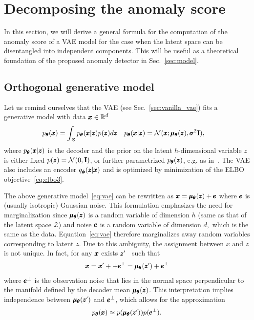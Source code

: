 \section{Decomposing the anomaly score} 
\label{sec:theory}
In this section, we will derive a general formula for the computation of the anomaly score of a VAE model for the case when the latent space can be disentangled into independent components. This will be useful as a theoretical foundation of the proposed anomaly detector in Sec.~\ref{sec:model}.

\subsection{Orthogonal generative model} \label{sec:orthogonal_score}
Let us remind ourselves that the VAE (see Sec.~\ref{sec:vanilla_vae}) fits a generative model with data $\pmb{{x}} \in \mathbb{R}^d$
\begin{align}
p_{\pmb{{\theta}}}(\pmb{{x}}) & = \int_{\mathcal{Z}} p_{\pmb{{\theta}}}(\pmb{{x}} \vert \pmb{{z}})p(\pmb{{z}})d\pmb{{z}} & p_{\pmb{{\theta}}}(\pmb{{x}} \vert \pmb{{z}}) & =\mathcal{N}(\pmb{{x}};\pmb{{\mu}}_{\pmb{{\theta}}}(\pmb{{z}}),\pmb{{\sigma}}^{2} \mathbf{I}),\label{eq:vae}
\end{align}
where $p_{\pmb{{\theta}}}(\pmb{{x}}\vert \pmb{{z}})$ is the decoder and the prior on the latent $h$-dimensional variable $z$ is either fixed $p(\pmb{{z}})=\mathcal{N}(0,\mathbf{I})$, or further parametrized $p_{\pmb{{\theta}}}(\pmb{{z}})$, e.g. as in~\cite{tomczak2017vae}. The VAE also includes an encoder $q_{\pmb{{\phi}}}(\pmb{{z}}\vert \pmb{{x}})$ and is optimized by minimization of the ELBO objective~\eqref{eq:elbo3}. 

The above generative model~\eqref{eq:vae} can be rewritten as $\pmb{{x}}=\pmb{{\mu}}_{\pmb{{\theta}}}(\pmb{{z}})+\pmb{{e}}$ where $\pmb{{e}}$ is (usually isotropic) Gaussian noise. This formulation emphasizes the need for marginalization since $\pmb{{\mu}}_{\pmb{{\theta}}}(\pmb{{z}})$ is a random variable of dimension $h$ (same as that of the latent space $\mathcal{Z}$) and noise $\pmb{{e}}$ is a random variable of dimension $d,$ which is the same as the data. Equation~\eqref{eq:vae} therefore marginalizes away random variables corresponding to latent $z.$ Due to this ambiguity, the assignment between $x$ and $z$ is not unique. In fact, for any $\pmb{{x}}$ exists  $\pmb{{z}}'$~\cite{pidhorskyi2018generative, vsmidl2019anomaly} such that \[
\pmb{{x}}=\pmb{{x}}' + +\pmb{{e}}^{\bot} = \pmb{{\mu}}_{\pmb{{\theta}}}(\pmb{{z}}')+\pmb{{e}}^{\bot}
\]
where $\pmb{{e}}^{\bot}$ is the observation noise that lies in the normal space perpendicular to the manifold defined by the decoder mean $\pmb{{\mu}}_{\pmb{{\theta}}}(\pmb{{z}})$. This interpretation implies independence between $\pmb{{\mu}}_{\pmb{{\theta}}}(\pmb{{z}}')$ and $\pmb{{e}}^\bot$, which allows for the approximation 
\begin{equation}
p_{\pmb{{\theta}}}(\pmb{{x}})\approx p(\pmb{{\mu}}_{\pmb{{\theta}}}(\pmb{{z}}'))p(\pmb{{e}}^{\bot}). 
\end{equation}

